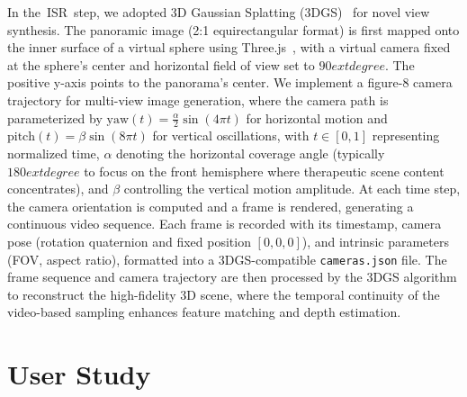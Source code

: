 \documentclass[]{interact}
\newcommand{\stepcs}{ISR}
\begin{document}
In the~\stepcs~step, we adopted 3D Gaussian Splatting (3DGS)~\cite{kerbl2023gaussiansplatting} for novel view synthesis. The panoramic image (2:1 equirectangular format) is first mapped onto the inner surface of a virtual sphere using Three.js~\cite{threejs}, with a virtual camera fixed at the sphere's center and horizontal field of view set to $90	extdegree$. The positive y-axis points to the panorama's center. We implement a figure-8 camera trajectory for multi-view image generation, where the camera path is parameterized by $\text{yaw}(t) = \frac{\alpha}{2}\sin(4\pi t)$ for horizontal motion and $\text{pitch}(t) = \beta\sin(8\pi t)$ for vertical oscillations, with $t \in [0,1]$ representing normalized time, $\alpha$ denoting the horizontal coverage angle (typically $180	extdegree$ to focus on the front hemisphere where therapeutic scene content concentrates), and $\beta$ controlling the vertical motion amplitude. At each time step, the camera orientation is computed and a frame is rendered, generating a continuous video sequence. Each frame is recorded with its timestamp, camera pose (rotation quaternion and fixed position $[0,0,0]$), and intrinsic parameters (FOV, aspect ratio), formatted into a 3DGS-compatible \texttt{cameras.json} file. The frame sequence and camera trajectory are then processed by the 3DGS algorithm to reconstruct the high-fidelity 3D scene, where the temporal continuity of the video-based sampling enhances feature matching and depth estimation.

%



\section{User Study}
\end{document}
